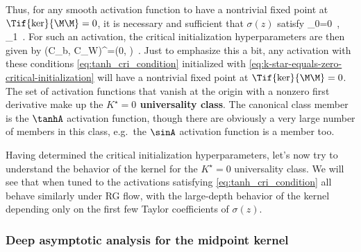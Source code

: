 Thus, for any smooth activation function to have a nontrivial fixed point at $\Tif{\ker}{\M\M}=0$, it is necessary and sufficient that $\sigma(z)$ satisfy
\be\label{eq:tanh_cri_condition}
\sigma_0=0\, , \qquad  \sigma_1\, .
\ee
For such an activation, the critical initialization hyperparameters are then given by 
\be\label{eq:k-star-equals-zero-critical-initialization}
\le(C_b, C_W\ri)^{}=\le(0, \ri)\, .
\ee
Just to emphasize this a bit, any activation with these conditions \eqref{eq:tanh_cri_condition} initialized with \eqref{eq:k-star-equals-zero-critical-initialization} will have a nontrivial fixed point at $\Tif{\ker}{\M\M}=0$. The set of activation functions that vanish at the origin with a nonzero first derivative make up the
\textbf{\boldmath$K^\star=0$ universality class}.
The canonical class member is the $\tanhA$ activation function, though there are obviously a very large number of members in this class, e.g.~the $\sinA$ activation function is a member too. 



Having determined the critical initialization hyperparameters, let's now try to understand the behavior of the kernel 
for the $K^\star=0$ universality class.
We will see that when tuned to  the activations satisfying \eqref{eq:tanh_cri_condition} all behave similarly under RG flow, with the large-depth behavior of the kernel depending only on the first few Taylor coefficients of $\sigma(z)$.















\subsubsection{Deep asymptotic analysis for the midpoint kernel}


